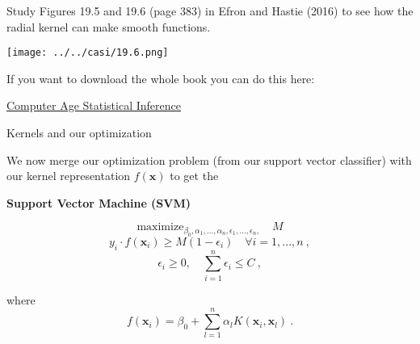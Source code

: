 \documentclass[10pt,ignorenonframetext,]{beamer}
\begin{document}
\begin{frame}

Study Figures 19.5 and 19.6 (page 383) in Efron and Hastie (2016) to see
how the radial kernel can make smooth functions.

\centering

\texttt{[image: ../../casi/19.6.png]}

\flushleft
\small

If you want to download the whole book you can do this here:

\href{https://web.stanford.edu/~hastie/CASI_files/PDF/casi.pdf}{Computer
Age Statistical Inference}

\end{frame}

\begin{frame}

\begin{block}{Kernels and our optimization}

\vspace{2mm}

We now merge our optimization problem (from our support vector
classifier) with our kernel representation \(f({\boldsymbol x})\) to get
the

\vspace{4mm}

\textbf{Support Vector Machine (SVM)}

\[\mathrm{maximize}_{\beta_0,\alpha_1,...,\alpha_n,\epsilon_1,...,\epsilon_n,} \quad M \]
\[y_i \cdot f({\boldsymbol x}_i)\geq M(1-\epsilon_i) \quad  \forall i=1,...,n \ ,\]
\[\epsilon_i\geq 0, \quad \sum_{i=1}^n \epsilon_i \leq C \ ,\]

where
\[f({\boldsymbol x}_i)=\beta_0 +\sum_{l=1}^n \alpha_l K({\boldsymbol x}_i,{\boldsymbol x}_l) \ .\]

\end{block}

\end{frame}
\end{document}
